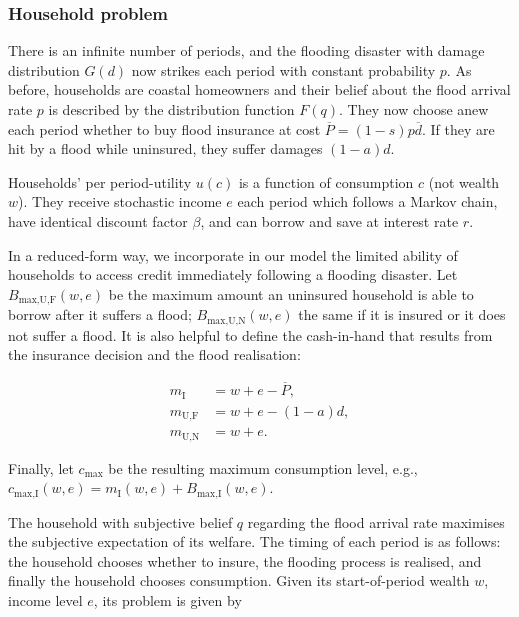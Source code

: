 \documentclass[12pt]{article}
\begin{document}
\subsubsection{Household problem}

There is an infinite number of periods, and the flooding disaster with damage distribution $G(d)$ now strikes each period with constant probability $p$. As before, households are coastal homeowners and their belief about the flood arrival rate $p$ is described by the distribution function $F(q)$.  They now choose anew each period whether to buy flood insurance at cost $\overline{P}=(1-s)p\overline{d}$. If they are hit by a flood while uninsured, they suffer damages $(1-a)d$.

Households' per period-utility $u(c)$ is a function of consumption $c$ (not wealth $w$). They receive stochastic income $e$ each period which follows a Markov chain, have identical discount factor $\beta$, and can borrow and save at interest rate $r$.  



In a reduced-form way, we incorporate in our model the limited ability of households to access credit immediately following a flooding disaster. Let $B_{\text{max,U,F}}(w,e)$ be the maximum amount an uninsured household is able to borrow after it suffers a flood; $B_{\text{max,U,N}}(w,e)$ the same if it is insured or it does not suffer a flood. It is also helpful to define the cash-in-hand that results from the insurance decision and the flood realisation:

\begin{equation}
\begin{aligned}
m_\text{I} &= w + e - \overline{P}, \\
m_\text{U,F}   &= w + e - (1-a)d, \\
m_\text{U,N}  &= w + e.
\end{aligned}
\end{equation}

Finally, let $c_{\text{max}}$ be the resulting maximum consumption level, e.g., $c_{\text{max,I}}(w,e)=m_\text{I}(w,e)+B_{\text{max,I}}(w,e)$. 


The household with subjective belief $q$ regarding the flood arrival rate maximises the subjective expectation of its welfare. The timing of each period is as follows: the household chooses whether to insure, the flooding process is realised, and finally the household chooses consumption. Given its start-of-period wealth $w$, income level $e$, its problem is given by 
\end{document}
